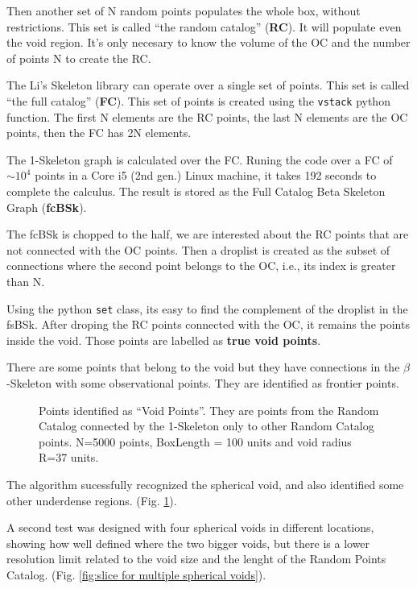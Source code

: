 \documentclass[preprint]{aastex62}
\begin{document}
Then another set of N random points populates the whole box, without restrictions.
This set is called ``the random catalog'' (\textbf{RC}). It will populate even
the void region. It's only necesary to know the volume of the OC and the number
of points N to create the RC.

The Li's Skeleton library can operate over a single set of points. This set is called
``the full catalog'' (\textbf{FC}). This set of points is created using the
\texttt{vstack} python function. The first N elements are the RC points, the last
N elements are the OC points, then the FC has 2N elements.

The 1-Skeleton graph is calculated over the FC. Runing the code over a FC of
$\sim 10^4$ points in a Core i5 (2nd gen.) Linux machine, it takes 192 seconds
to complete the calculus. The result is stored as the Full Catalog Beta
Skeleton Graph (\textbf{fcBSk}).

The fcBSk is chopped to the half, we are interested about the RC points that
are not connected with the OC points. Then a droplist is created as the
subset of connections where the second point belongs to the OC, i.e., its index
is greater than N.

Using the python  \texttt{set} class, its easy to find the complement of the
droplist in the fsBSk. After droping the RC points connected with the OC, it
remains the points inside the void. Those points are labelled as
\textbf{true void points}.

There are some points that belong to the void but they have connections in the
$\beta$-Skeleton with some observational points. They are identified as
frontier points.


\begin{figure}
  \caption{Points identified as ``Void Points''. They are points from the Random Catalog
    connected by the 1-Skeleton only to other Random Catalog points. 
    N=5000 points, BoxLength = 100 units and void radius R=37 units.
    \label{fig:First void recognition}}
\end{figure}

The algorithm sucessfully recognized the spherical void, and also identified
some other underdense regions. (Fig. \ref{fig:First void recognition}).

A second test was designed with four spherical voids in different locations, showing
how well defined where the two bigger voids, but there is a lower resolution limit
related to the void size and the lenght of the Random Points Catalog.
(Fig. \ref{fig:slice for multiple spherical voids}).
\end{document}

